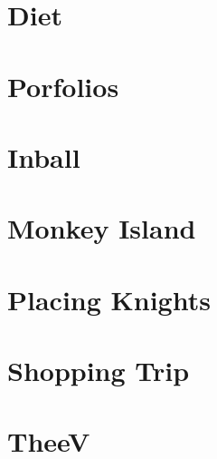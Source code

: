\documentclass[a4paper, 10pt]{article}
\let\stdsection\section
\renewcommand\section{\newpage\stdsection}
\newcommand{\includecode}[1]{
    }
\begin{document}
    \section{Diet}
        \includecode{../problems/w08/Diet/Diet1.cpp}
        
    \section{Porfolios}
        \includecode{../problems/w08/Portfolios/Portfolios1.cpp}
    
    \section{Inball}
        \includecode{../problems/w08/Inball/Inball1.cpp}
    
    
    \section{Monkey Island}
        \includecode{../problems/w09/MonkeyIsland/MonkeyIsland1.cpp}
        
    \section{Placing Knights}
        \includecode{../problems/w09/Placing_Knights/PlacingKnights1.cpp}
        
    \section{Shopping Trip}
        \includecode{../problems/w09/Shopping_Trip/ShoppingTrip1.cpp}
        
    \section{TheeV}
        \includecode{../problems/w09/TheeV/TheeV1.cpp}
   
\end{document}
